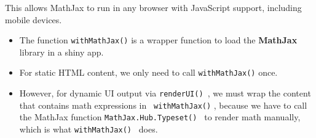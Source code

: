 \documentclass[12pt]{article}
\begin{document}
This allows MathJax to run in any browser with JavaScript support, including mobile devices.

\begin{itemize}
\item The function  \texttt{withMathJax()}  is a wrapper function to load the \textbf{MathJax }library in a shiny app. 
\item For static HTML content, we only need to call  \texttt{withMathJax()}  once. 
\item 
However, for dynamic UI output via  \texttt{renderUI() }, we must wrap the content that 
contains math expressions in \texttt{ withMathJax()} , because we have to call the MathJax 
function  \texttt{MathJax.Hub.Typeset() } to render math manually, which is what  \texttt{withMathJax() }
does.
\end{itemize}
\end{document}
